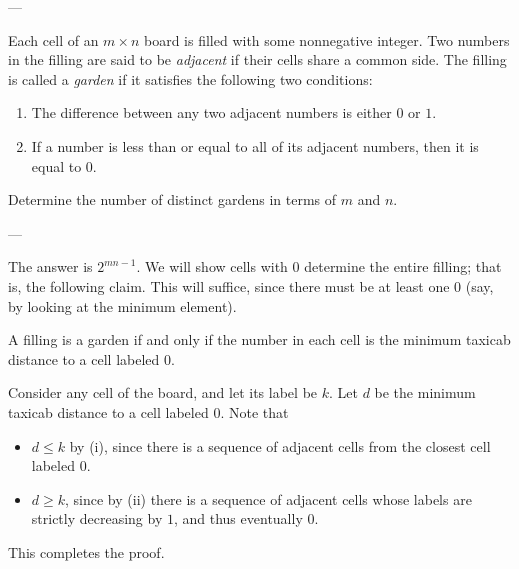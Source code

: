 
---

Each cell of an $m\times n$ board is filled with some nonnegative integer. Two numbers in the filling are said to be \emph{adjacent} if their cells share a common side. The filling is called a \emph{garden} if it satisfies the following two conditions:
\begin{enumerate}[label=(\roman*),itemsep=0em]
    \item The difference between any two adjacent numbers is either $0$ or $1$.
    \item If a number is less than or equal to all of its adjacent numbers, then it is equal to $0$.
\end{enumerate}
Determine the number of distinct gardens in terms of $m$ and $n$.

---

The answer is $2^{mn-1}$. We will show cells with $0$ determine the entire filling; that is, the following claim. This will suffice, since there must be at least one $0$ (say, by looking at the minimum element).
\begin{iclaim*}
    A filling is a garden if and only if the number in each cell is the minimum taxicab distance to a cell labeled $0$.
\end{iclaim*}
Consider any cell of the board, and let its label be $k$. Let $d$ be the minimum taxicab distance to a cell labeled $0$. Note that
\begin{itemize}
    \item $d\le k$ by (i), since there is a sequence of adjacent cells from the closest cell labeled $0$.
    \item $d\ge k$, since by (ii) there is a sequence of adjacent cells whose labels are strictly decreasing by $1$, and thus eventually $0$.
\end{itemize}
This completes the proof.

